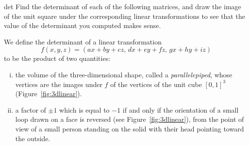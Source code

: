\documentclass[indent]{watsonbook}
\begin{document}
{\begin{exercise}{}{det}
  Find the determinant of each of the following matrices, and draw the
  image of the unit square under the corresponding linear
  transformations to see that the value of the determinant you
  computed makes sense.

  \pairofprobs{$\left[\begin{array}{cc} 1 & 0 \\ 0 & -1 \end{array}\right]$}{
    $\left[\begin{array}{cc} 2 & 1 \\ 0 & 2 \end{array}\right]$}

  \pairofprobs{$\left[\begin{array}{cc} 0 & 1 \\ -1 & 0 \end{array}\right]$}{
    $\left[\begin{array}{cc} 2 & 1  \\ 4 & 2 \end{array}\right]$}
\end{exercise}

We define the determinant of a linear transformation
\[
  f(x,y,z) = (ax + by + cz, \, dx + ey + fz,\, gx + hy  + iz)
\]
to be the product of two quantities:
\begin{enumerate}[(i),topsep=-6pt]
  \item the volume of the three-dimensional shape, called a
    \textit{parallelepiped}, whose vertices are the images under $f$
    of the vertices of the unit cube $[0,1]^3$
    (Figure~\ref{fig:3dlinear}).
  \item a factor of
    $\pm1$ which is equal to $-1$ if and only if the orientation of a
    small loop drawn on a face is reversed (see
    Figure~\ref{fig:3dlinear}), from the point of view of a small
    person standing on the solid with their head pointing toward the
    outside.
\end{enumerate}

}
\end{document}
